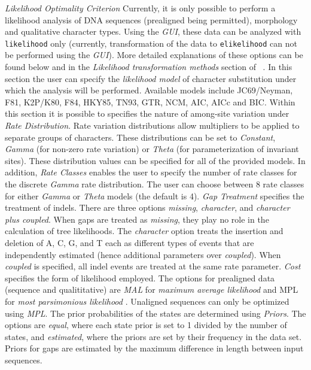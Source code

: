 	\hangindent=1cm  \emph{Likelihood Optimality Criterion} Currently, it is only possible to perform 
	 	a likelihood analysis of DNA sequences (prealigned being permitted), morphology and qualitative 
		character types. Using the \emph{GUI}, these data can be analyzed with 
		\texttt{likelihood} only (currently, transformation of the data to \texttt{elikelihood} can not be performed 
		using the \emph{GUI}). More detailed explanations of these options can be found below and in the 
		\emph{Likelihood transformation methods} section of  ~.
		 In this section the user can specify the \emph{likelihood model} of character 
		substitution under which the analysis will be performed.  Available models include JC69/Neyman, 
		F81, K2P/K80, F84, HKY85, TN93, GTR, NCM, AIC, AICc and BIC.  Within this section it is possible to specifies 
		the nature of among-site variation under \emph{Rate Distribution}.  Rate variation distributions allow 
		multipliers to be applied to separate groups of characters. 
		   These distributions can be set to \emph{Constant}, \emph{Gamma} (for non-zero 
		   rate variation) or  \emph{Theta} (for parameterization of invariant sites).  These distribution
		   values can be specified for all of the provided models. In addition, \emph{Rate Classes} enables the user to 
		   specify the number of rate classes for the discrete \emph{Gamma} rate distribution. 
		   The user can choose between 8 rate classes for either \emph{Gamma} or \emph{Theta}
		   models (the default is 4).  \emph{Gap Treatment}  specifies the treatment of indels.  There are 
		   three options \emph{missing},  \emph{character}, and \emph{character plus coupled}.  When gaps are treated 
		   as \emph{missing}, they play no role in the calculation of tree likelihoods.  The \emph{character} 
		   option treats the insertion and deletion of A, C, G, and T each as different types of events that are 
		   independently estimated (hence additional parameters over \emph{coupled}). When \emph{coupled} 
		   is specified, all indel events are treated at the same rate parameter. 
		  \emph{Cost} specifies the form of likelihood employed.  The options for prealigned data 
		   (sequence and qualititative) are \emph{MAL} for \emph{maximum average likelihood} and {MPL} for 
		   \emph{most parsimonious likelihood} \cite{barryandhartigan1987}. Unaligned sequences can only be 
		   optimized using \emph{MPL}.  The prior probabilities of the states are determined using \emph{Priors}.   
		   The options are \emph{equal}, where each state prior is set to 1 divided by the number of states, and 
		   \emph{estimated}, where the priors are set by their frequency in the data set.  Priors for gaps are estimated 
		   by the maximum difference in length between input sequences.


